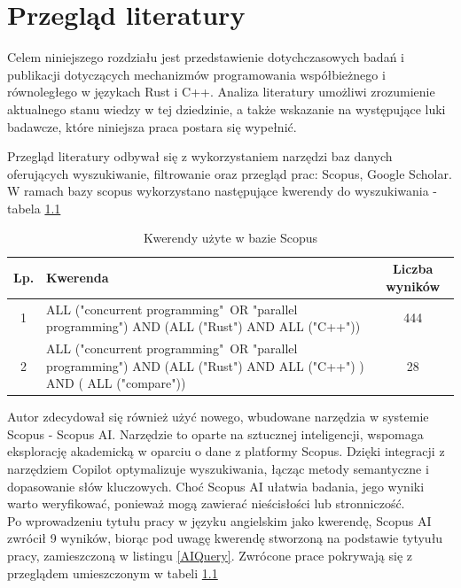 \chapter{Przegląd literatury}
Celem niniejszego rozdziału jest przedstawienie dotychczasowych badań i publikacji dotyczących mechanizmów programowania współbieżnego i równoległego w językach Rust i C++. Analiza literatury umożliwi zrozumienie aktualnego stanu wiedzy w tej dziedzinie, a także wskazanie na występujące luki badawcze, które niniejsza praca postara się wypełnić.

Przegląd literatury odbywał się z wykorzystaniem narzędzi baz danych oferujących wyszukiwanie, filtrowanie oraz przegląd prac: Scopus, Google Scholar.\\
W ramach bazy scopus wykorzystano następujące kwerendy do wyszukiwania - tabela \ref{table:literatureReviewQueries}

\begin{table}[H]
    \caption{Kwerendy użyte w bazie Scopus \protect \footnotemark}
    \label{table:literatureReviewQueries}
    \begin{tabular}{|c|p{11cm}|c|}
    \hline
    Lp. & Kwerenda & Liczba wyników \\ \hline
    1 & ALL ("concurrent programming"\ OR "parallel programming") AND (ALL ("Rust") AND ALL ("C++")) & 444 \\ \hline
    2 & ALL ("concurrent programming"\ OR "parallel programming") AND (ALL ("Rust") AND ALL ("C++") ) AND ( ALL ("compare")) & 28 \\ \hline
    \end{tabular}
\end{table}

Autor zdecydował się również użyć nowego, wbudowane narzędzia w systemie Scopus - Scopus AI. Narzędzie to oparte na sztucznej inteligencji, wspomaga eksplorację akademicką w oparciu o dane z platformy Scopus. Dzięki integracji z narzędziem Copilot optymalizuje wyszukiwania, łącząc metody semantyczne i dopasowanie słów kluczowych. Choć Scopus AI ułatwia badania, jego wyniki warto weryfikować, ponieważ mogą zawierać nieścisłości lub stronniczość. \\
Po wprowadzeniu tytułu pracy w języku angielskim jako kwerendę, Scopus AI zwrócił 9 wyników, biorąc pod uwagę kwerendę stworzoną na podstawie tytyułu pracy, zamieszczoną w listingu \ref{AIQuery}. Zwrócone prace pokrywają się z przeglądem umieszczonym w tabeli \ref{table:literatureReviewQueries} 

